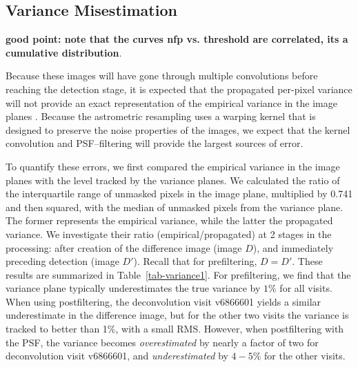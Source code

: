 \documentclass[prd, nofootinbib, floatfix, 11pt,tightenlines,times]{article}
\begin{document}
\subsection{Variance Misestimation}

{\bf good point: note that the curves nfp vs. threshold are
  correlated, its a cumulative distribution}.

Because these images will have gone through multiple convolutions
before reaching the detection stage, it is expected that the
propagated per-pixel variance will not provide an exact representation
of the empirical variance in the image planes \citep{Price-Stacking}.
Because the astrometric resampling uses a warping kernel that is
designed to preserve the noise properties of the images, we expect
that the kernel convolution and PSF--filtering will provide the largest
sources of error.

To quantify these errors, we first compared the empirical variance in
the image planes with the level tracked by the variance planes.  We
calculated the ratio of the interquartile range of unmasked pixels in
the image plane, multiplied by 0.741 and then squared, with the median
of unmasked pixels from the variance plane.  The former represents the
empirical variance, while the latter the propagated variance.  We
investigate their ratio (empirical/propagated) at 2 stages in the
processing: after creation of the difference image (image $D$), and
immediately preceding detection (image $D'$).  Recall that for
prefiltering, $D = D'$.  These results are summarized in
Table~\ref{tab-variance1}.  For prefiltering, we find that the
variance plane typically underestimates the true variance by $1\%$ for
all visits.  When using postfiltering, the deconvolution visit
v6866601 yields a similar underestimate in the difference image, but
for the other two visits the variance is tracked to better than 1\%,
with a small RMS.  However, when postfiltering with the PSF, the
variance becomes {\it overestimated} by nearly a factor of two for
deconvolution visit v6866601, and {\it underestimated} by $4-5\%$ for
the other visits.
\end{document}
